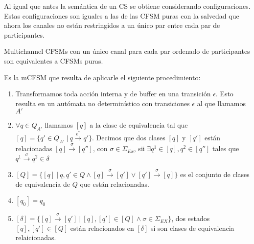 Al igual que antes la semántica de un CS se obtiene considerando configuraciones. Estas configuraciones son iguales a las de las CFSM puras con la salvedad que ahora los canales no están restringidos a un único par entre cada par de participantes.

 

% 
% 

Multichannel CFSMs  con un único canal para cada par ordenado de participantes son equivalentes a CFSMs puras.

\begin{definition} Es la mCFSM que resulta de aplicarle el siguiente procedimiento:
\begin{enumerate}
    \item Transformamos toda acción interna y de buffer en una transición $\epsilon$. Esto resulta en un autómata no determinístico con transiciones $\epsilon$ al que llamamos $A'$
    \item $\forall q \in Q_{A'}$ llamamos $[q]$ a la clase de equivalencia tal que $[q]=\{q' \in Q_{A'}\ |\ q \xrightarrow{\epsilon^*} q'\}$. Decimos que dos clases $[q]$ y $[q']$ están relacionadas $[q] \xrightarrow{\sigma} [q'']$, con $\sigma \in \Sigma_{Ex}$, sii $\exists q^1 \in [q], q^2 \in [q'']$ tales que $q^1 \xrightarrow{\sigma} q^2 \in \delta$
    \item $[Q]= \{[q] \ | \ q, q' \in Q \land [q] \xrightarrow{\sigma} [q'] \lor [q'] \xrightarrow{\sigma} [q] \}$ es el conjunto de clases de equivalencia de $Q$ que están relacionadas. 
    \item $[q_0]=q_0$
    \item $[\delta]= \{[q] \xrightarrow{\sigma} [q']\ |\ [q], [q'] \in [Q] \land \sigma \in \Sigma_{EX}\}$, dos estados $[q],[q'] \in [Q]$ están relacionados en $[\delta]$ si son clases de equivalencia relaicionadas. 
\end{enumerate}
\end{definition}

